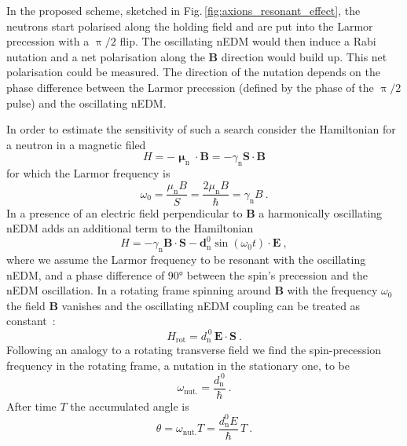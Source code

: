 In the proposed scheme, sketched in Fig.\,\ref{fig:axions_resonant_effect}, the neutrons start polarised along the holding field and are put into the Larmor precession with a $\uppi/2$ flip. The oscillating nEDM would then induce a Rabi nutation and a net polarisation along the $\mathbf{B}$ direction would build up. This net polarisation could be measured. The direction of the nutation depends on the phase difference between the Larmor precession (defined by the phase of the $\uppi/2$ pulse) and the oscillating nEDM\@.

In order to estimate the sensitivity of such a search consider the Hamiltonian for a neutron in a magnetic filed
\begin{equation}
  H = - \boldsymbol{\upmu}_\text{n} \cdot \mathbf{B} = - \gamma_\text{n} \mathbf{S} \cdot \mathbf{B}
\end{equation}
for which the Larmor frequency is
\begin{equation}
  \omega_0 = \frac{\mu_\text{n} B}{S} = \frac{2 \mu_\text{n} B}{\hbar} = \gamma_\text{n} B \ .
\end{equation}
In a presence of an electric field perpendicular to $\mathbf{B}$ a harmonically oscillating nEDM adds an additional term to the Hamiltonian
\begin{equation}
  H = - \gamma_\text{n} \mathbf{B} \cdot \mathbf{S} - \mathbf{d}_\text{n}^0 \sin (\omega_0 t) \cdot \mathbf{E} \ ,
\end{equation}
where we assume the Larmor frequency to be resonant with the oscillating nEDM, and a phase difference of \ang{90} between the spin's precession and the nEDM oscillation. In a rotating frame spinning around $\mathbf{B}$ with the frequency $\omega_0$ the field $\mathbf{B}$ vanishes and the oscillating nEDM coupling can be treated as constant~\cite{RamseyBook}:
\begin{equation}
  H_\text{rot} = d_\text{n}^{\,0} \, \mathbf{E} \cdot \mathbf{S} \ .
\end{equation}
Following an analogy to a rotating transverse field we find the spin-precession frequency in the rotating frame, a nutation in the stationary one, to be
\begin{equation}
  \omega_\text{nut.} = \frac{d_\text{n}^{\,0}}{\hbar} \ .
\end{equation}
After time $T$ the accumulated angle is
\begin{equation}
  \theta = \omega_\text{nut.} T = \frac{d_\text{n}^0 E }{\hbar} \, T \ .
  \label{eq:resonant_the_angle}
\end{equation}
